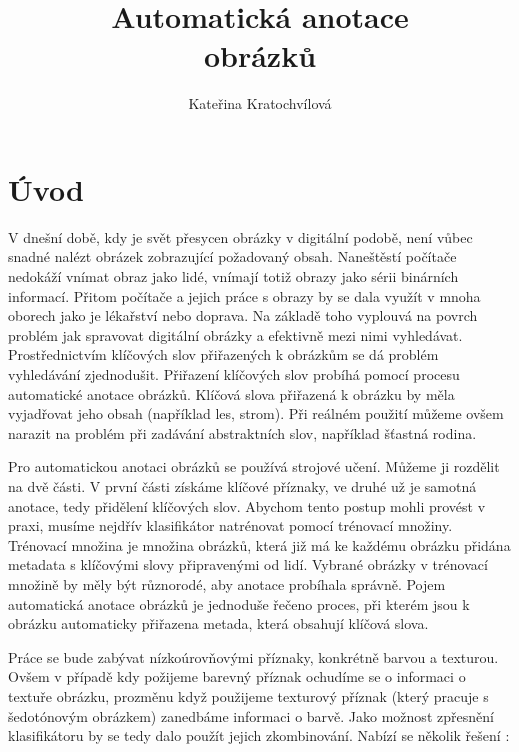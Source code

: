 \documentclass[czech,BP]{thesiskiv}
\author{Kateřina Kratochvílová}
\title{Automatická anotace\\obrázků}
\begin{document}
%
\maketitle
\tableofcontents
{}
\thispagestyle{empty}


\chapter{Úvod}
\setcounter{page}{1}
\par V dnešní době, kdy je svět přesycen obrázky v digitální podobě, není vůbec snadné nalézt obrázek zobrazující požadovaný obsah. Naneštěstí počítače nedokáží vnímat obraz jako lidé, vnímají totiž obrazy jako sérii binárních informací. Přitom počítače a jejich práce s obrazy by se dala využít v mnoha oborech jako je lékařství nebo doprava. Na základě toho vyplouvá na povrch problém jak spravovat digitální obrázky a efektivně mezi nimi vyhledávat. Prostřednictvím klíčových slov přiřazených k obrázkům se dá problém vyhledávání zjednodušit. Přiřazení klíčových slov probíhá pomocí procesu automatické anotace obrázků. Klíčová slova přiřazená k obrázku by měla vyjadřovat jeho obsah (například les, strom). Při reálném použití můžeme ovšem narazit na problém při zadávání abstraktních slov, například šťastná rodina.  

\par Pro automatickou anotaci obrázků se používá strojové učení. Můžeme ji rozdělit na dvě části. V první části získáme klíčové příznaky, ve druhé už je samotná anotace, tedy přidělení klíčových slov. Abychom tento postup mohli provést v praxi, musíme nejdřív klasifikátor natrénovat pomocí trénovací množiny. Trénovací množina je množina obrázků, která již má ke každému obrázku přidána metadata s klíčovými slovy připravenými od lidí. Vybrané obrázky v trénovací množině by měly být různorodé, aby anotace probíhala správně. Pojem automatická anotace obrázků je jednoduše řečeno proces, při kterém jsou k obrázku automaticky přiřazena metada, která obsahují klíčová slova. 

\par Práce se bude zabývat nízkoúrovňovými příznaky, konkrétně barvou a texturou. Ovšem v případě kdy požijeme barevný příznak ochudíme se o informaci o textuře obrázku, prozměnu když použijeme texturový příznak (který pracuje s šedotónovým obrázkem) zanedbáme informaci o barvě. Jako možnost zpřesnění klasifikátoru by se tedy dalo použít jejich zkombinování. Nabízí se několik řešení \cite{DiplomovaBrno}:   
\end{document}
